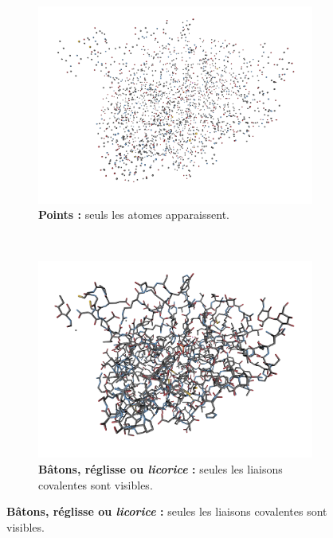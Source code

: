\begin{appendices}
	
	\newcommand{\subImgW}{0.32\textwidth}
	\begin{figure}[!htbp]
		\begin{subfigure}[t]{\subImgW}
			\centering
			\includegraphics[width=\textwidth]{./figures/ch1/4awn_points}
			\caption[Représentation en points]{\textbf{Points :} seuls les atomes apparaissent.}
			\label{fig:4awn_points}
		\end{subfigure}
		~
		\begin{subfigure}[t]{\subImgW}
			\centering
			\includegraphics[width=\textwidth]{./figures/ch1/4awn_licorice}
			\caption[Représentation en réglisse]{\textbf{Bâtons, réglisse ou \emph{licorice} :} seules les liaisons covalentes sont visibles.}
			\label{fig:4awn_licorice}
		\end{subfigure}

\end{figure}
\end{appendices}
